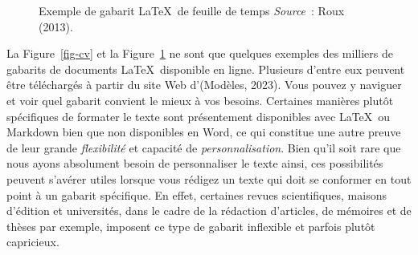 \documentclass[
  letterpaper,
  DIV=11,
  numbers=noendperiod]{scrreprt}
\begin{document}
\begin{figure}


\caption{\label{fig-invoice}Exemple de gabarit \LaTeX~de feuille de
temps \newline \textit{Source}~: Roux (2013).}

\end{figure}%

La Figure~\ref{fig-cv} et la Figure~\ref{fig-invoice} ne sont que
quelques exemples des milliers de gabarits de documents
\LaTeX~disponible en ligne. Plusieurs d'entre eux peuvent être
téléchargés à partir du site Web d'(Modèles, 2023). Vous pouvez y
naviguer et voir quel gabarit convient le mieux à vos besoins. Certaines
manières plutôt spécifiques de formater le texte sont présentement
disponibles avec \LaTeX~ou Markdown bien que non disponibles en Word, ce
qui constitue une autre preuve de leur grande \emph{flexibilité} et
capacité de \emph{personnalisation}. Bien qu'il soit rare que nous ayons
absolument besoin de personnaliser le texte ainsi, ces possibilités
peuvent s'avérer utiles lorsque vous rédigez un texte qui doit se
conformer en tout point à un gabarit spécifique. En effet, certaines
revues scientifiques, maisons d'édition et universités, dans le cadre de
la rédaction d'articles, de mémoires et de thèses par exemple, imposent
ce type de gabarit inflexible et parfois plutôt capricieux.
\end{document}
